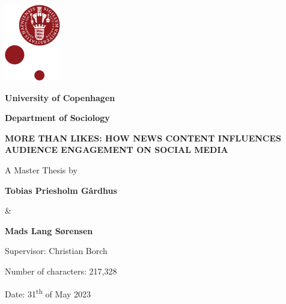 \documentclass[
]{article}
\author{}
\date{\vspace{-2.5em}}
\begin{document}
\thispagestyle{empty}

\vspace{2cm}

\includegraphics[]{images/ku_logo_no_txt.png}

\vspace{2cm}

\Large

\textbf{University of Copenhagen}

\textbf{Department of Sociology}

\begin{centering}

\vspace{3cm}

\Large

\doublespacing
\textbf{MORE THAN LIKES: HOW NEWS CONTENT INFLUENCES AUDIENCE ENGAGEMENT ON SOCIAL MEDIA}

\vspace{1 cm}

\normalsize
\singlespacing
A Master Thesis by

\vspace{0.5 cm}

\Large

\textbf{Tobias Priesholm Gårdhus}

\normalsize
\vspace{0.5 cm}

\&

\vspace{0.5 cm}
\Large
\textbf{Mads Lang Sørensen}

\normalsize
\vspace{1.5 cm}

Supervisor: Christian Borch 


Number of characters: 217,328


Date: 31\textsuperscript{th} of May 2023 

\vspace{1.5 cm}

\end{centering}
\normalsize

\newpage

\onehalfspacing 
\end{document}
